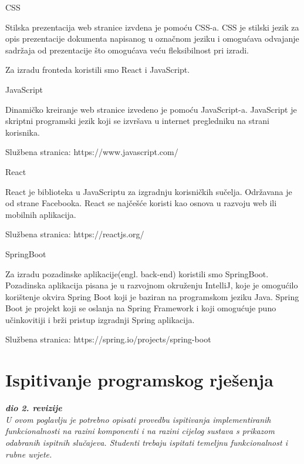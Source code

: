 CSS

Stilska prezentacija web stranice izvdena je pomoću CSS-a.
CSS je stilski jezik za opis prezentacije dokumenta napisanog u označnom jeziku i omogućava odvajanje sadržaja od prezentacije što omogućava veću fleksibilnost pri izradi. 

\vspace{8mm}
Za izradu fronteda koristili smo React i JavaScript. 
\vspace{4mm}

JavaScript

Dinamičko kreiranje web stranice izvedeno je pomoću JavaScript-a. JavaScript je skriptni programski jezik koji se izvršava u internet pregledniku
na strani korisnika.

Službena stranica: https://www.javascript.com/
\vspace{3mm}

React

React je biblioteka u JavaScriptu za izgradnju korisničkih sučelja. Održavana je od strane Facebooka. 
React se najčešće koristi kao osnova u razvoju web ili mobilnih aplikacija. 

Službena stranica: https://reactjs.org/
\vspace{3mm}

SpringBoot

Za izradu pozadinske aplikacije(engl. back-end) koristili smo SpringBoot. Pozadinska aplikacija pisana je u razvojnom okruženju IntelliJ, koje je
omogućilo korištenje okvira Spring Boot koji je baziran na programskom jeziku Java. Spring Boot je projekt koji se oslanja na Spring Framework i koji omogućuje puno učinkovitiji i brži pristup izgradnji Spring aplikacija.

Službena stranica: https://spring.io/projects/spring-boot
\vspace{5mm}

			
			
			\eject 
		
	
		\section{Ispitivanje programskog rješenja}
			
			\textbf{\textit{dio 2. revizije}}\\
			
			 \textit{U ovom poglavlju je potrebno opisati provedbu ispitivanja implementiranih funkcionalnosti na razini komponenti i na razini cijelog sustava s prikazom odabranih ispitnih slučajeva. Studenti trebaju ispitati temeljnu funkcionalnost i rubne uvjete.}
	
